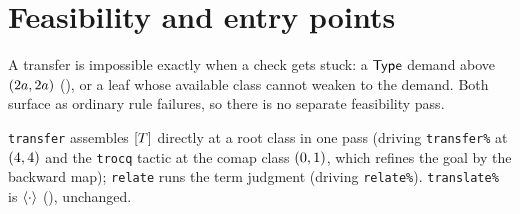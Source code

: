 \section{Feasibility and entry points}
\label{sec:entry}

\begin{remark}
  \label{rem:feasibility}
  A transfer is impossible exactly when a check gets stuck: a $\mathsf{Type}$ demand
  above $(2a,2a)$ (), or a leaf whose available class
  cannot weaken to the demand. Both surface as ordinary rule failures, so there
  is no separate feasibility pass.
\end{remark}

\begin{definition}
  \label{def:entry}
  \leanok
  \texttt{transfer} assembles $[ T ]$ directly at a root class in one pass
  (driving \texttt{transfer\%} at $(4,4)$ and the \texttt{trocq} tactic at
  the comap class $(0,1)$, which refines the goal by the backward map);
  \texttt{relate} runs the term judgment (driving \texttt{relate\%}).
  \texttt{translate\%} is $\langle \cdot \rangle$ (), unchanged.
\end{definition}
